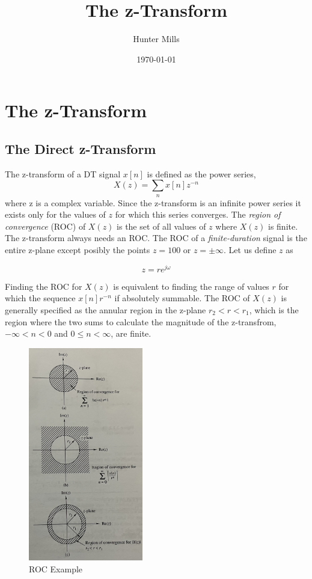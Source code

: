 \documentclass{article} %
\title{The z-Transform} %
\author{Hunter Mills} %
\date{\today} %
\begin{document}
    \maketitle %
    
    \section{The z-Transform} %
	\subsection{The Direct z-Transform}
	The z-transform of a DT signal $x[n]$ is defined as the power series,
	\begin{equation}
	X(z) = \sum_n x[n]z^{-n}
	\end{equation}
	where z is a complex variable. Since the z-transform is an infinite power series it exists only for the values of $z$ for which this series converges. The \textit{region of convergence} (ROC) of $X(z)$ is the set of all values of $z$ where $X(z)$ is finite. The z-transform always needs an ROC. The ROC of a \textit{finite-duration} signal is the entire z-plane except posibly the points $z = 100$ or $z = \pm \infty$. Let us define $z$ as
	
	\begin{equation}
	z = re^{j\omega}
	\end{equation}
	
	Finding the ROC for $X(z)$ is equivalent to finding the range of values $r$ for which the sequence $x[n]r^{-n}$ if absolutely summable. The ROC of $X(z)$ is generally specified as the annular region in the z-plane $r_2 < r < r_1$, which is the region where the two sums to calculate the magnitude of the z-transfrom, $-\infty < n < 0$ and $0 \le n < \infty$, are finite. 
	
	\begin{figure}[h]
	\centering
	\includegraphics[width=5cm]{roc}
	\caption{ROC Example}
	\end{figure}
	
\end{document}
